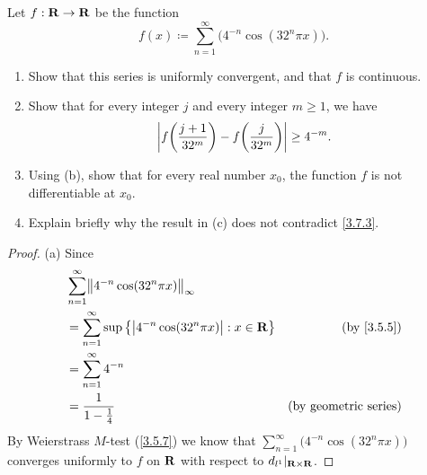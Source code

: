 \begin{exercise}\label{ex 4.7.10}
  Let \(f : \mathbf{R} \to \mathbf{R}\) be the function
  \[
    f(x) \coloneqq \sum_{n = 1}^\infty \big(4^{-n} \cos(32^n \pi x)\big).
  \]
  \begin{enumerate}
    \item Show that this series is uniformly convergent, and that \(f\) is continuous.
    \item Show that for every integer \(j\) and every integer \(m \geq 1\), we have
          \[
            \left\lvert f\bigg(\frac{j + 1}{32^m}\bigg) - f\bigg(\frac{j}{32^m}\bigg)\right\rvert \geq 4^{-m}.
          \]
    \item Using (b), show that for every real number \(x_0\), the function \(f\) is not differentiable at \(x_0\).
    \item Explain briefly why the result in (c) does not contradict \cref{3.7.3}.
  \end{enumerate}
\end{exercise}

\begin{proof}{(a)}
  Since
  \begin{align*}
     & \sum_{n = 1}^\infty \norm*{4^{-n} \cos(32^n \pi x)}_{\infty}                                                  \\
     & = \sum_{n = 1}^\infty \sup\big\{\abs{4^{-n} \cos(32^n \pi x)} : x \in \R\big\} & \text{(by \cref{3.5.5})}     \\
     & = \sum_{n = 1}^\infty 4^{-n}                                                                                  \\
     & = \frac{1}{1 - \frac{1}{4}}                                                    & \text{(by geometric series)}
  \end{align*}
  By Weierstrass \(M\)-test (\cref{3.5.7}) we know that \(\sum_{n = 1}^\infty \big(4^{-n} \cos(32^n \pi x)\big)\) converges uniformly to \(f\) on \(\mathbf{R}\) with respect to \(d_{l^1}|_{\mathbf{R} \times \mathbf{R}}\).
\end{proof}

